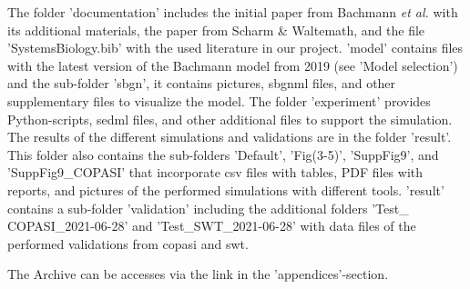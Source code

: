 The folder 'documentation' includes the initial paper from Bachmann \textit{et al.}  with its additional materials, the paper from Scharm \& Waltemath, and the file 'SystemsBiology.bib' with the used literature in our project. 'model' contains files with the latest version of the Bachmann model from 2019 (see 'Model selection') and the sub-folder 'sbgn', it contains pictures, \ac{sbgnml} files, and other supplementary files to visualize the model. The folder 'experiment' provides Python-scripts, \ac{sedml} files, and other additional files to support the simulation. The results of the different simulations and validations are in the folder 'result'. This folder also contains the sub-folders 'Default', 'Fig(3-5)', 'SuppFig9', and 'SuppFig9\_COPASI' that incorporate \ac{csv} files with tables, PDF files with reports, and pictures of the performed simulations with different tools.  'result' contains a sub-folder 'validation'  including the additional folders 'Test\_ COPASI\_2021-06-28' and 'Test\_SWT\_2021-06-28' with data files of the performed validations from \ac{copasi} and \ac{swt}.

The Archive can be accesses via the link in the 'appendices'-section.
